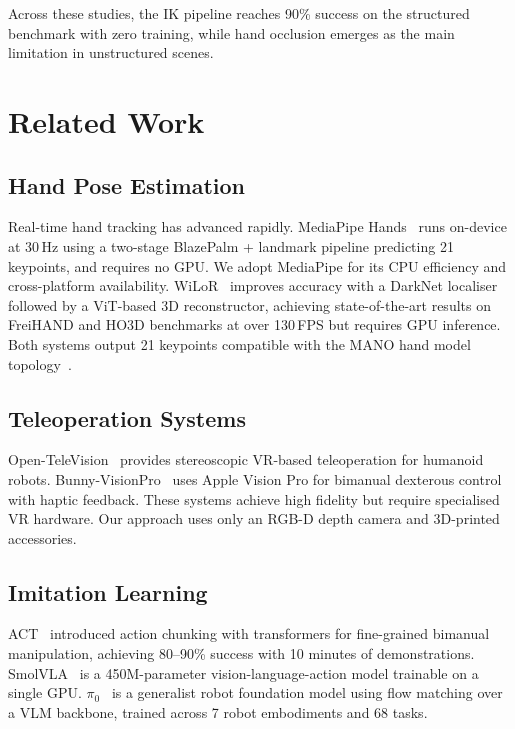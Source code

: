 \documentclass[10pt,journal]{IEEEtran}
\begin{document}
Across these studies, the IK pipeline reaches 90\% success on the
structured benchmark with zero training, while hand occlusion emerges as
the main limitation in unstructured scenes.

\section{Related Work}
\label{sec:related}

\subsection{Hand Pose Estimation}
Real-time hand tracking has advanced rapidly. MediaPipe
Hands~\cite{zhang2020mediapipe} runs on-device at 30\,Hz using a
two-stage BlazePalm + landmark pipeline predicting 21 keypoints,
and requires no GPU. We adopt MediaPipe for its CPU efficiency and
cross-platform availability.
WiLoR~\cite{potamias2024wilor} improves accuracy with a DarkNet
localiser followed by a ViT-based 3D reconstructor, achieving
state-of-the-art results on FreiHAND and HO3D benchmarks at over
130\,FPS but requires GPU inference. Both systems output 21 keypoints
compatible with the MANO hand model topology~\cite{romero2017mano}.

\subsection{Teleoperation Systems}
Open-TeleVision~\cite{cheng2025opentv} provides stereoscopic VR-based
teleoperation for humanoid robots. Bunny-VisionPro~\cite{ding2024bunny}
uses Apple Vision Pro for bimanual dexterous control with haptic
feedback. These systems achieve high fidelity but require specialised
VR hardware. Our approach uses only an RGB-D depth camera and
3D-printed accessories.

\subsection{Imitation Learning}
ACT~\cite{zhao2023act} introduced action chunking with transformers for
fine-grained bimanual manipulation, achieving 80--90\% success with
10 minutes of demonstrations. SmolVLA~\cite{cadena2025smolvla} is a
450M-parameter vision-language-action model trainable on a single GPU.
$\pi_0$~\cite{black2024pi0} is a generalist robot foundation model
using flow matching over a VLM backbone, trained across 7 robot
embodiments and 68 tasks.
\end{document}
